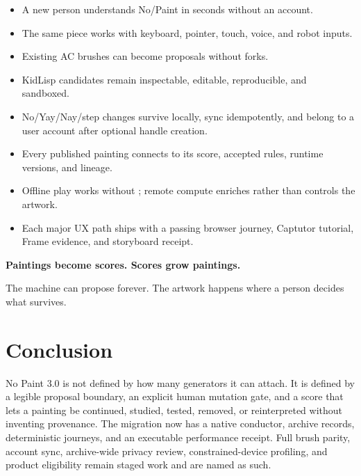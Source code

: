 \documentclass[10pt,letterpaper,twocolumn]{article}
\newcommand{\mono}[1]{\code{#1}}
\begin{document}
\begin{itemize}
  \item A new person understands No/Paint in seconds without an account.
  \item The same piece works with keyboard, pointer, touch, voice, and robot inputs.
  \item Existing AC brushes can become proposals without forks.
  \item KidLisp candidates remain inspectable, editable, reproducible, and sandboxed.
  \item No/Yay/Nay/step changes survive locally, sync idempotently, and belong to a user account after optional handle creation.
  \item Every published painting connects to its score, accepted rules, runtime versions, and lineage.
  \item Offline play works without \mono{jastow}; remote compute enriches rather than controls the artwork.
  \item Each major UX path ships with a passing browser journey, Captutor tutorial, Frame evidence, and storyboard receipt.
\end{itemize}

\begin{hero}
\centering
{\large\bfseries Paintings become scores. Scores grow paintings.}\par
\vspace{3pt}
The machine can propose forever. The artwork happens where a person decides what survives.
\end{hero}

\balance
\section{Conclusion}

No Paint 3.0 is not defined by how many generators it can attach. It is defined by a legible proposal boundary, an explicit human mutation gate, and a score that lets a painting be continued, studied, tested, removed, or reinterpreted without inventing provenance. The migration now has a native conductor, archive records, deterministic journeys, and an executable performance receipt. Full brush parity, account sync, archive-wide privacy review, constrained-device profiling, and product eligibility remain staged work and are named as such.



\end{document}
